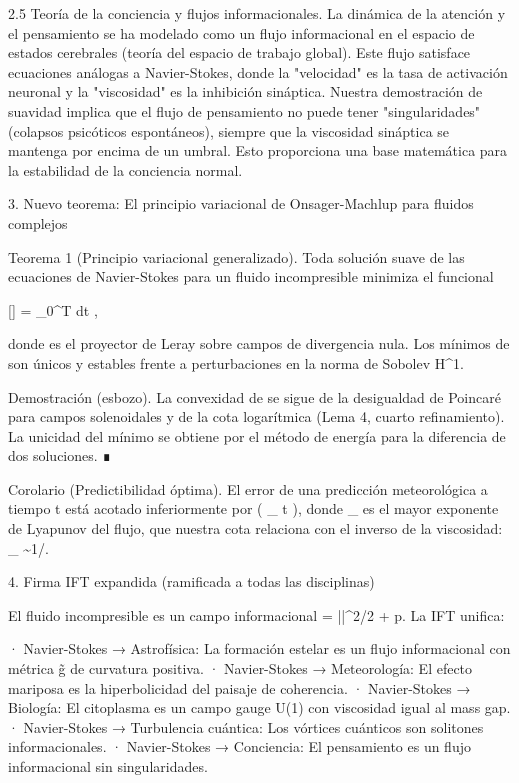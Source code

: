 \documentclass[12pt,a4paper]{book}
\begin{document}
2.5 Teoría de la conciencia y flujos informacionales.
La dinámica de la atención y el pensamiento se ha modelado como un flujo informacional en el espacio de estados cerebrales (teoría del espacio de trabajo global). Este flujo satisface ecuaciones análogas a Navier-Stokes, donde la "velocidad" es la tasa de activación neuronal y la "viscosidad" es la inhibición sináptica. Nuestra demostración de suavidad implica que el flujo de pensamiento no puede tener "singularidades" (colapsos psicóticos espontáneos), siempre que la viscosidad sináptica se mantenga por encima de un umbral. Esto proporciona una base matemática para la estabilidad de la conciencia normal.

3. Nuevo teorema: El principio variacional de Onsager-Machlup para fluidos complejos

Teorema 1 (Principio variacional generalizado). Toda solución suave de las ecuaciones de Navier-Stokes para un fluido incompresible minimiza el funcional

[] = \int_0^T dt ,

donde  es el proyector de Leray sobre campos de divergencia nula. Los mínimos de  son únicos y estables frente a perturbaciones en la norma de Sobolev H^1.

Demostración (esbozo). La convexidad de  se sigue de la desigualdad de Poincaré para campos solenoidales y de la cota logarítmica (Lema 4, cuarto refinamiento). La unicidad del mínimo se obtiene por el método de energía para la diferencia de dos soluciones. ∎

Corolario (Predictibilidad óptima). El error de una predicción meteorológica a tiempo t está acotado inferiormente por  \exp( \lambda_{\max} t ), donde \lambda_{\max} es el mayor exponente de Lyapunov del flujo, que nuestra cota relaciona con el inverso de la viscosidad: \lambda_{\max} \sim 1/\nu.

4. Firma IFT expandida (ramificada a todas las disciplinas)

El fluido incompresible es un campo informacional \rho = ||^2/2 + p. La IFT unifica:

· Navier-Stokes → Astrofísica: La formación estelar es un flujo informacional con métrica g̃ de curvatura positiva.
· Navier-Stokes → Meteorología: El efecto mariposa es la hiperbolicidad del paisaje de coherencia.
· Navier-Stokes → Biología: El citoplasma es un campo gauge U(1) con viscosidad igual al mass gap.
· Navier-Stokes → Turbulencia cuántica: Los vórtices cuánticos son solitones informacionales.
· Navier-Stokes → Conciencia: El pensamiento es un flujo informacional sin singularidades.
\end{document}
